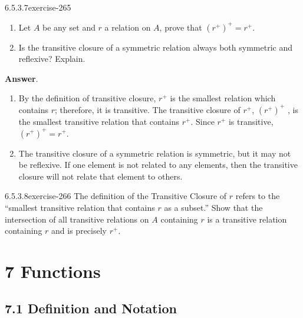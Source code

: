 \documentclass[twoside,10pt,]{book}
\numberwithin{equation}{section}
\begin{document}
\begin{divisionsolution}{6.5.3.7}{}{exercise-265}%
\hypertarget{p-2233}{}%
\leavevmode%
\begin{enumerate}[label=(\alph*)]
\item\hypertarget{li-1170}{}\hypertarget{p-2234}{}%
Let \(A\) be any set and \(r\) a relation on \(A\), prove that \(\left(r^+\right)^+=r^+\).%
\item\hypertarget{li-1171}{}\hypertarget{p-2235}{}%
Is the transitive closure of a symmetric relation always both symmetric and reflexive? Explain.%
\end{enumerate}
%
\par\smallskip%
\noindent\textbf{Answer}.\quad%
\hypertarget{p-2236}{}%
\leavevmode%
\begin{enumerate}[label=(\alph*)]
\item\hypertarget{li-1172}{}\hypertarget{p-2237}{}%
By the definition of transitive closure, \(r^+\) is the smallest relation which contains \(r\); therefore, it is transitive. The transitive closure of \(r^+\), \(\left(r^+\right)^+\) , is the smallest transitive relation that contains \(r^+\). Since \(r^+\) is transitive, \(\left(r^+\right)^+=r^+\).%
\item\hypertarget{li-1173}{}\hypertarget{p-2238}{}%
The transitive closure of a symmetric relation is symmetric, but it may not be reflexive. If one element is not related to any elements, then the transitive closure will not relate that element to others.%
\end{enumerate}
%
\end{divisionsolution}%
\begin{divisionsolution}{6.5.3.8}{}{exercise-266}%
\hypertarget{p-2239}{}%
The definition of the Transitive Closure of \(r\) refers to the ``smallest transitive relation that contains \(r\) as a subset.''  Show that the intersection of all transitive relations on \(A\) containing \(r\) is a transitive relation containing \(r\) and is precisely \(r^+\).%
\end{divisionsolution}%
\chapter*{7 Functions}
\section*{7.1 Definition and Notation}
\end{document}
